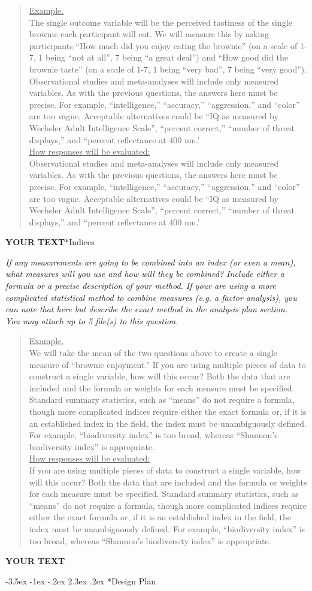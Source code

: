 \documentclass{article}
\makeatletter
\newcommand{\example}[2]{\vspace{-0.3cm}\begin{quote}\underline{Example.}\\#1\ifx#2\undefined \else \\[0.2cm]\underline{How responses will be evaluated:}\\#2\fi\\\end{quote}}
\newcommand{\yourtext}[1]{\noindent\textbf{\color{red}YOUR TEXT}}
\renewcommand{\section}{\@startsection {section}{1}{\z@}%
	{-3.5ex \@plus -1ex \@minus -.2ex}%
	{2.3ex \@plus .2ex}%
	{\normalfont\LARGE\bfseries}}
\makeatother
\begin{document}
	\example{
		The single outcome variable will be the perceived tastiness of the single brownie each participant will eat. We will measure this by asking participants ``How much did you enjoy eating the brownie'' (on a scale of 1-7, 1 being ``not at all'', 7 being ``a great deal'') and ``How good did the brownie taste'' (on a scale of 1-7, 1 being ``very bad'', 7 being ``very good'').
		}{Observational studies and meta-analyses will include only measured variables. As with the previous questions, the answers here must be precise. For example, ``intelligence,'' ``accuracy,'' ``aggression,'' and ``color'' are too vague. Acceptable alternatives could be ``IQ as measured by Wechsler Adult Intelligence Scale'', ``percent correct,'' ``number of threat displays,'' and ``percent reflectance at 400 nm.'}
	\fi
	
	\yourtext
	
	\subsection*{Indices}
	
	\ifx\hidehints\undefined
	
	\textit{%
		If any measurements are  going to be combined into an index (or even a mean), what measures will you use and how will they be combined? Include either a formula or a precise description of your method. If your are using a more complicated statistical method to combine measures (e.g. a factor analysis), you can note that here but describe the exact method in the analysis plan section.\\
		You may attach up to 5 file(s) to this question. 
	}\\
	
	\example{
		We will take the mean of the two questions above to create a single measure of ``brownie enjoyment.''}{		
		If you are using multiple pieces of data to construct a single variable, how will this occur? Both the data that are included and the formula or weights for each measure must be specified. Standard summary statistics, such as ``means'' do not require a formula, though more complicated indices require either the exact formula or, if it is an established index in the field, the index must be unambiguously defined. For example, ``biodiversity index'' is too broad, whereas ``Shannon's biodiversity index'' is appropriate.
	}
	\fi
	
	\yourtext

\newpage

\section*{Design Plan}
\end{document}
